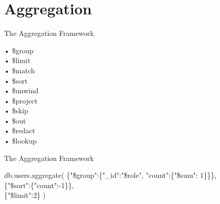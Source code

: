 \documentclass{beamer}
\begin{document}
\section{Aggregation}
\begin{frame}{The Aggregation Framework}

\begin{minipage}[t]{0.3\textwidth}
	\begin{Alms*}
	• \$group \\
	• \$limit \\
	• \$match \\
	• \$sort \\
	• \$unwind \\
	• \$project \\
	• \$skip \\
	• \$out \\
	• \$redact \\
	• \$lookup \\
	\end{Alms*}
\end{minipage}
\hfill
\begin{minipage}[t]{0.7\textwidth}
	
\end{minipage}

\end{frame}

\begin{frame}{The Aggregation Framework}

	\scriptsize
	\begin{Alms*}
	db.users.aggregate(\NI
	\{"\$group":\{"\_id":"\$role", "count":\{"\$sum": 1\}\}\}, \\
	\{"\$sort":\{"count":-1\}\}, \\
	\{"\$limit":2\}
	\ND )
	\end{Alms*}

\end{frame}
\end{document}
